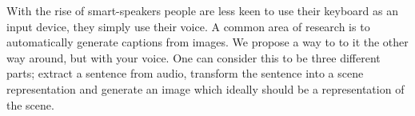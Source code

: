 \documentclass[../main.tex]{subfiles}
\begin{document}
With the rise of smart-speakers people are less keen to use their keyboard as an input device, they simply use their voice. A common area of research is to automatically generate captions from images. We propose a way to to it the other way around, but with your voice. One can consider this to be three different parts; extract a sentence from audio, transform the sentence into a scene representation and generate an image which ideally should be a representation of the scene. 
\end{document}
